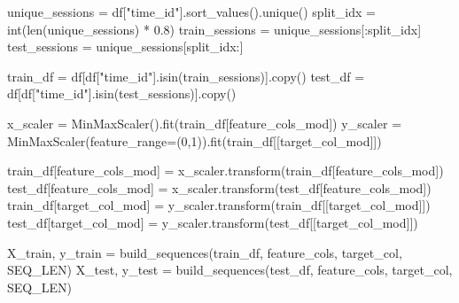 \documentclass[
  letterpaper,
  DIV=11,
  numbers=noendperiod]{scrartcl}
\newenvironment{Shaded}{\begin{snugshade}}{\end{snugshade}}
\newcommand{\BuiltInTok}[1]{\textcolor[rgb]{0.00,0.23,0.31}{#1}}
\newcommand{\DecValTok}[1]{\textcolor[rgb]{0.68,0.00,0.00}{#1}}
\newcommand{\FloatTok}[1]{\textcolor[rgb]{0.68,0.00,0.00}{#1}}
\newcommand{\NormalTok}[1]{\textcolor[rgb]{0.00,0.23,0.31}{#1}}
\newcommand{\OperatorTok}[1]{\textcolor[rgb]{0.37,0.37,0.37}{#1}}
\newcommand{\StringTok}[1]{\textcolor[rgb]{0.13,0.47,0.30}{#1}}
\begin{document}
\begin{Shaded}
\begin{Highlighting}[]
\NormalTok{unique\_sessions }\OperatorTok{=}\NormalTok{ df[}\StringTok{"time\_id"}\NormalTok{].sort\_values().unique()}
\NormalTok{split\_idx       }\OperatorTok{=} \BuiltInTok{int}\NormalTok{(}\BuiltInTok{len}\NormalTok{(unique\_sessions) }\OperatorTok{*} \FloatTok{0.8}\NormalTok{)          }
\NormalTok{train\_sessions  }\OperatorTok{=}\NormalTok{ unique\_sessions[:split\_idx]}
\NormalTok{test\_sessions   }\OperatorTok{=}\NormalTok{ unique\_sessions[split\_idx:]}
\end{Highlighting}
\end{Shaded}

\begin{Shaded}
\begin{Highlighting}[]
\NormalTok{train\_df }\OperatorTok{=}\NormalTok{ df[df[}\StringTok{"time\_id"}\NormalTok{].isin(train\_sessions)].copy()}
\NormalTok{test\_df  }\OperatorTok{=}\NormalTok{ df[df[}\StringTok{"time\_id"}\NormalTok{].isin(test\_sessions)].copy()}
\end{Highlighting}
\end{Shaded}

\begin{Shaded}
\begin{Highlighting}[]
\NormalTok{x\_scaler }\OperatorTok{=}\NormalTok{ MinMaxScaler().fit(train\_df[feature\_cols\_mod])}
\NormalTok{y\_scaler }\OperatorTok{=}\NormalTok{ MinMaxScaler(feature\_range}\OperatorTok{=}\NormalTok{(}\DecValTok{0}\NormalTok{,}\DecValTok{1}\NormalTok{)).fit(train\_df[[target\_col\_mod]])}

\NormalTok{train\_df[feature\_cols\_mod] }\OperatorTok{=}\NormalTok{ x\_scaler.transform(train\_df[feature\_cols\_mod])}
\NormalTok{test\_df[feature\_cols\_mod]  }\OperatorTok{=}\NormalTok{ x\_scaler.transform(test\_df[feature\_cols\_mod])}
\NormalTok{train\_df[target\_col\_mod]   }\OperatorTok{=}\NormalTok{ y\_scaler.transform(train\_df[[target\_col\_mod]])}
\NormalTok{test\_df[target\_col\_mod]    }\OperatorTok{=}\NormalTok{ y\_scaler.transform(test\_df[[target\_col\_mod]])}
\end{Highlighting}
\end{Shaded}

\begin{Shaded}
\begin{Highlighting}[]
\NormalTok{X\_train, y\_train }\OperatorTok{=}\NormalTok{ build\_sequences(train\_df, feature\_cols, target\_col, SEQ\_LEN)}
\NormalTok{X\_test,  y\_test  }\OperatorTok{=}\NormalTok{ build\_sequences(test\_df,  feature\_cols, target\_col, SEQ\_LEN)}
\end{Highlighting}
\end{Shaded}
\end{document}

